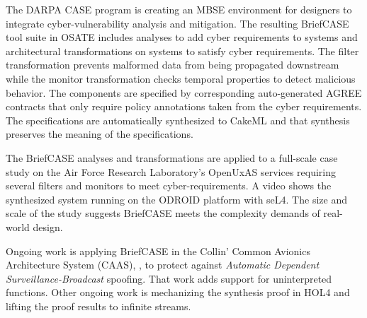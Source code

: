 The DARPA CASE program is creating an MBSE environment for designers to integrate cyber-vulnerability analysis and mitigation. The resulting BriefCASE tool suite in OSATE includes analyses to add cyber requirements to systems and architectural transformations on systems to satisfy cyber requirements. The filter transformation prevents malformed data from being propagated downstream while the monitor transformation checks temporal properties to detect malicious behavior. The components are specified by corresponding auto-generated AGREE contracts that only require policy annotations taken from the cyber requirements. The specifications are automatically synthesized to CakeML and that synthesis preserves the meaning of the specifications.

The BriefCASE analyses and transformations are applied to a full-scale case study on the Air Force Research Laboratory's OpenUxAS services requiring several filters and monitors to meet cyber-requirements. A video shows the synthesized system running on the ODROID platform with seL4. The size and scale of the study suggests BriefCASE meets the complexity demands of real-world design.

Ongoing work is applying BriefCASE in the Collin' Common Avionics Architecture System (CAAS), \cite{caas}, to protect against \emph{Automatic Dependent Surveillance-Broadcast} spoofing. That work adds support for uninterpreted functions. Other ongoing work is mechanizing the synthesis proof in HOL4 and lifting the proof results to infinite streams.